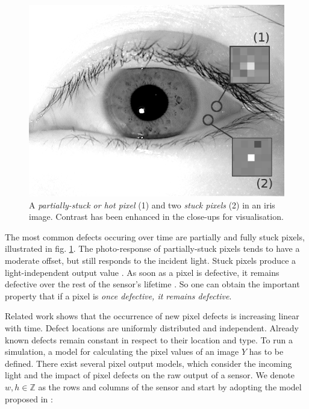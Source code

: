 \documentclass[10pt,twocolumn,letterpaper]{article}
\begin{document}
\begin{figure}
\centering
\includegraphics[width=0.7\linewidth]{img/defects.png}
\caption{A \emph{partially-stuck or hot pixel} (1) and two \emph{stuck pixels} (2) in an iris image. Contrast has been enhanced in the close-ups for visualisation.}
\label{fig:hotStuck}
\end{figure}

The most common defects occuring over time are partially and fully stuck pixels, illustrated in fig. \ref{fig:hotStuck}. The photo-response of partially-stuck pixels tends to have a moderate offset, but still responds to the incident light. Stuck pixels produce a light-independent output value \cite{fridrich}. As soon as a pixel is defective, it remains defective over the rest of the sensor's lifetime \cite{failureSemi}. So one can obtain the important property that if a pixel is \emph{once defective, it remains defective}.

Related work \cite{datingImages, inFieldDefects, defectDetection,failureSemi, defectIdentification, fridrich} shows that the occurrence of new pixel defects is increasing linear with time. Defect locations are uniformly distributed and independent. Already known defects remain constant in respect to their location and type. 
To run a simulation, a model for calculating the pixel values of an image $Y$ has to be defined. There exist several pixel output models, which consider the incoming light and the impact of pixel defects on the raw output of a sensor. We denote $w,h \in \mathbb{Z}$ as the rows and columns of the sensor and start by adopting the model proposed in \cite{fridrich}:
\end{document}
